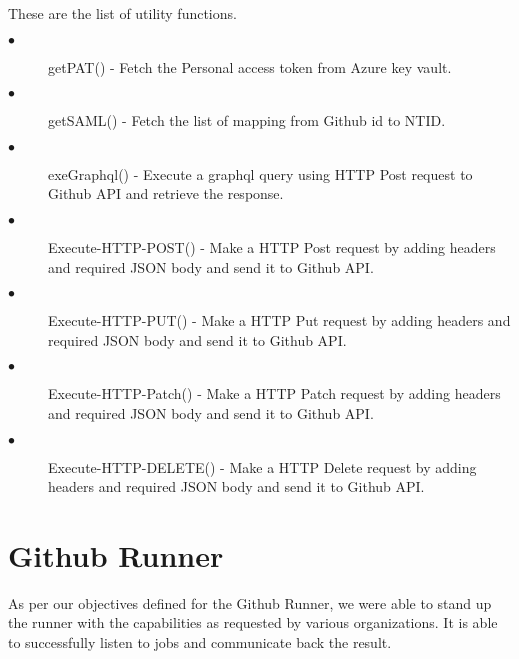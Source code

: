 These are the list of utility functions.
\begin{description}

\item[$\bullet$] getPAT() - Fetch the Personal access token from Azure key vault.

\item[$\bullet$] getSAML() - Fetch the list of mapping from Github id to NTID.

\item[$\bullet$] exeGraphql() - Execute a graphql query using HTTP Post request to Github API and retrieve the response.

\item[$\bullet$] Execute-HTTP-POST() - Make a HTTP Post request by adding headers and required JSON body and send it to Github API.

\item[$\bullet$] Execute-HTTP-PUT() - Make a HTTP Put request by adding headers and required JSON body and send it to Github API.

\item[$\bullet$] Execute-HTTP-Patch() - Make a HTTP Patch request by adding headers and required JSON body and send it to Github API.

\item[$\bullet$] Execute-HTTP-DELETE() - Make a HTTP Delete request by adding headers and required JSON body and send it to Github API.

\end{description}

\section{Github Runner}
As per our objectives defined for the Github Runner, we were able to stand up the runner with the capabilities as requested by various organizations. It is able to successfully listen to jobs and communicate back the result.
